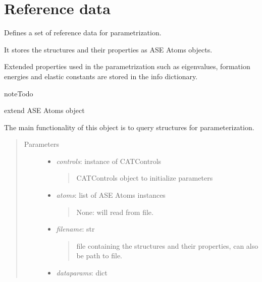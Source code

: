 \documentclass[letterpaper,10pt,english]{sphinxmanual}
\begin{document}
\section{Reference data}
\label{classes:module-catdata}\label{classes:reference-data}

\begin{fulllineitems}
\label{classes:catdata.CATData}
Defines a set of reference data for parametrization.

It stores the structures and their properties as ASE Atoms objects.

Extended properties used in the parametrization such as eigenvalues,
formation energies and elastic constants are stored in the info dictionary.

\begin{notice}{note}{Todo}

extend ASE Atoms object
\end{notice}

The main functionality of this object is to query structures for 
parameterization.
\begin{quote}\begin{description}
\item[{Parameters}] \leavevmode\begin{itemize}
\item {} 
\emph{controls}: instance of CATControls
\begin{quote}

CATControls object to initialize parameters
\end{quote}

\item {} 
\emph{atoms}: list of ASE Atoms instances
\begin{quote}

None: will read from file.
\end{quote}

\item {} 
\emph{filename}: str
\begin{quote}

file containing the structures and their properties, can also be 
path to file.
\end{quote}

\item {} 
\emph{dataparams}: dict
\begin{quote}


\end{quote}
\end{itemize}
\end{description}
\end{quote}
\end{fulllineitems}
\end{document}
